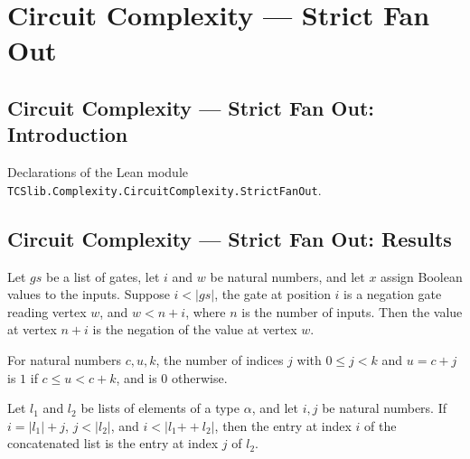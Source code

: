 \section{Circuit Complexity --- Strict Fan Out}
\subsection*{Circuit Complexity --- Strict Fan Out: Introduction}

Declarations of the Lean module \texttt{TCSlib.Complexity.CircuitComplexity.StrictFanOut}.

\subsection*{Circuit Complexity --- Strict Fan Out: Results}

\begin{theorem}
\label{BoolCircuit.vertexValue_not_gate}
\leanok
{}
Let $gs$ be a list of gates, let $i$ and $w$ be natural numbers, and let $x$ assign
Boolean values to the inputs. Suppose $i<|gs|$, the gate at position $i$ is a negation
gate reading vertex $w$, and $w<n+i$, where $n$ is the number of inputs. Then the value
at vertex $n+i$ is the negation of the value at vertex $w$.
\end{theorem}

\begin{theorem}
\label{BoolCircuit.countP_range_add}
\leanok
{}
For natural numbers $c,u,k$, the number of indices $j$ with $0 \le j < k$ and $u=c+j$ is
$1$ if $c \le u < c+k$, and is $0$ otherwise.
\end{theorem}

\begin{theorem}
\label{BoolCircuit.getElem_append_of_eq}
\leanok
{}
Let $l_1$ and $l_2$ be lists of elements of a type $\alpha$, and let $i,j$ be natural
numbers. If $i=|l_1|+j$, $j<|l_2|$, and $i<|l_1\mathbin{++}l_2|$, then the entry at
index $i$ of the concatenated list is the entry at index $j$ of $l_2$.
\end{theorem}

